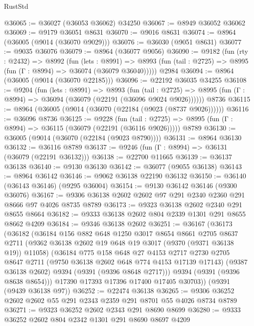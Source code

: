 \begin{lexlean}{RustStd}
\begin{coremodule}
@36065 := @36027 (@36053 @36062) @34250
@36067 := @8949 @36052 @36062
@36069 := @9179 @36051 @8631
@36070 := @9016 @8631
@36074 := @8964 (@36005 (@9014 (@36070 @9029)))
@36076 := @36030 (@9051 @8631)
@36077 := @9035 @36076
@36079 := @8964 (@36077 @9056)
@36090 := @9182
    (fun (rty : @2432) =>
    @8992
      (fun (lets : @8991) =>
      @8993 (fun (tail : @2725) => @8995 (fun (Γ : @8994) => @36074 (@36079 @36040)))))
    @2984
@36094 := @8964 (@36005 (@9014 (@36070 @22185)))
@36096 := @22192 @36035 @34255
@36108 := @9204
    (fun (lets : @8991) =>
    @8993
      (fun (tail : @2725) =>
      @8995 (fun (Γ : @8994) => @36094 (@36079 (@22191 (@36096 @9024 @9026))))))
    @8736
@36115 := @8964 (@36005 (@9014 (@36070 (@22184 (@9023 (@8737 @9026))))))
@36116 := @36096 @8736
@36125 := @9228
    (fun (tail : @2725) => @8995 (fun (Γ : @8994) => @36115 (@36079 (@22191 (@36116 @9026)))))
    @8789
@36130 := @36005 (@9014 (@36070 (@22184 (@9023 @8790))))
@36131 := @8964 @36130
@36132 := @36116 @8789
@36137 := @9246 (fun (Γ : @8994) => @36131 (@36079 (@22191 @36132)))
@36138 := @22700 @11665
@36139 := @36137 @36138
@36140 := @9130 @36130
@36142 := @36077 (@9055 @36138)
@36143 := @8964 @36142
@36146 := @9062 @36138 @22190 @36132
@36150 := @36140 (@36143 @36146) (@9295 @36004)
@36154 := @9130 @36142 @36146 (@9300 @36076)
@36167 := @9306 @36138 @2602 @2602 @97 @291 @2340 @2360 @291 @8666 @97 @4026 @8735 @8789
@36173 := @9323 @36138 @2602 @2340 @291 @8655 @8664
@36182 := @9333 @36138 @2602 @804 @2339 @1301 @291 @8655 @8662 @4209
@36184 := @9346 @36138 @2602
@36251 := @36167
    (@36173
      (@36182
        (@36184
          @156
          @882
          @648
          @1250
          @3017
          @8654
          @8661
          @2705
          @8637
          @2711
          (@9362 @36138 @2602 @19 @648 @19 @3017 (@9370 (@9371 @36138 @19)) @11058)
          (@36184
            @775
            @158
            @648
            @27
            @4153
            @2717
            @2730
            @2705
            @8647
            @2711
            (@9750 @36138 @2602 @648 @774 @4153 @17139 @17143)
            (@9387 @36138 @2602)
            @9394
            (@9391 (@9396 @8648 @2717)))
          @9394
          (@9391 (@9396 @8638 @8654)))
        @17390
        @17393
        @17396
        @17400
        @17405
        @30703))
    (@9391 (@9439 @36138 @97))
@36252 := @22474 @36138
@36265 := @9306 @36252 @2602 @2602 @55 @291 @2343 @2359 @291 @8701 @55 @4026 @8734 @8789
@36271 := @9323 @36252 @2602 @2343 @291 @8690 @8699
@36280 := @9333 @36252 @2602 @804 @2342 @1301 @291 @8690 @8697 @4209

\end{coremodule}
\end{lexlean}
